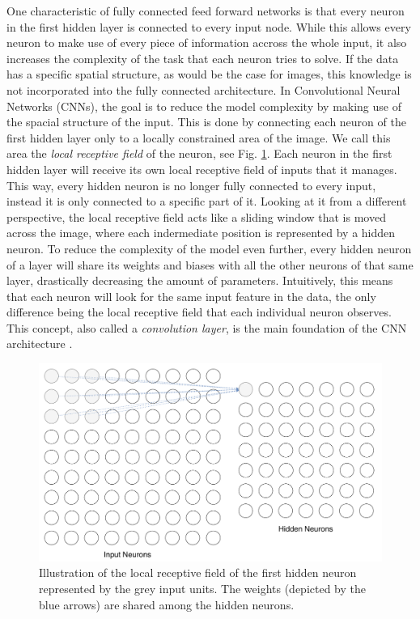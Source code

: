 One characteristic of fully connected feed forward networks is that
every neuron in the first hidden layer is connected to every input
node. While this allows every neuron to make use of every piece of
information accross the whole input, it also increases the complexity
of the task that each neuron tries to solve. If the data has a
specific spatial structure, as would be the case for images, this
knowledge is not incorporated into the fully connected
architecture. In Convolutional Neural Networks (CNNs), the goal is to
reduce the model complexity by making use of the spacial structure of
the input. This is done by connecting each neuron of the first hidden
layer only to a locally constrained area of the image. We call this
area the \textit{local receptive field} of the neuron, see
Fig. \ref{fig:receptive-field}. Each neuron in
the first hidden layer will receive its own local receptive field of
inputs that it manages. This way, every hidden
neuron is no longer fully connected to every input, instead it is only connected to a
specific part of it. Looking at it
from a different perspective, the local receptive field acts like a
sliding window that is moved across the image, where each indermediate
position is represented by a hidden neuron. To reduce the complexity
of the model even further, every hidden neuron of a layer will share
its weights and biases with all the other neurons of that same layer,
drastically decreasing the amount of parameters. Intuitively, this
means that each neuron will look for the same input feature in the
data, the only difference being the local receptive field that each
individual neuron observes. This concept, also called a
\textit{convolution layer}, is the main foundation of the CNN
architecture \cite{Nielsen}.
\begin{figure}[h]
  \centering
  \includegraphics[width=\textwidth]{../figures/receptive_field}
  \caption{Illustration of the local receptive field of the first
    hidden neuron represented by the grey input units. The weights
    (depicted by the blue arrows) are shared among the hidden
    neurons.}
  \label{fig:receptive-field}
\end{figure}

